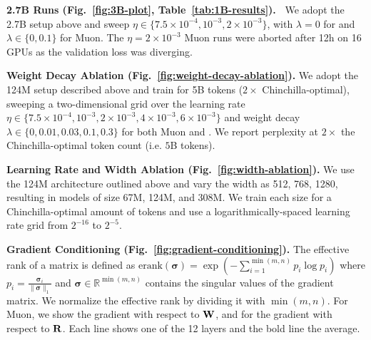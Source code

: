 \textbf{2.7B Runs (Fig.~\ref{fig:3B-plot}, Table~\ref{tab:1B-results}).\ } We adopt the 2.7B setup above and sweep $\eta \in \{7.5\times 10^{-4}, 10^{-3}, 2\times 10^{-3}\}$, with $\lambda=0$ for \algname{} and $\lambda \in \{0, 0.1\}$ for Muon. The $\eta=2\times 10^{-3}$ Muon runs were aborted after 12h on 16 GPUs as the validation loss was diverging.

\textbf{Weight Decay Ablation (Fig.~\ref{fig:weight-decay-ablation}).} We adopt the 124M setup described above and train for 5B tokens ($2\times$ Chinchilla-optimal), sweeping a two-dimensional grid over the learning rate $\eta \in \{7.5 \times 10^{-4}, 10^{-3}, 2 \times 10^{-3}, 4 \times 10^{-3}, 6 \times 10^{-3}\}$ and weight decay $\lambda \in \{0, 0.01, 0.03, 0.1, 0.3\}$ for both Muon and \algname{}. We report perplexity at $2\times$ the Chinchilla-optimal token count (i.e. $5$B tokens).

\textbf{Learning Rate and Width Ablation (Fig.~\ref{fig:width-ablation}).} We use the 124M architecture outlined above and vary the width as 512, 768, 1280, resulting in models of size 67M, 124M, and 308M. We train each size for a Chinchilla-optimal amount of tokens and use a logarithmically-spaced learning rate grid from $2^{-16}$ to $2^{-5}$. 

\textbf{Gradient Conditioning (Fig.\ \ref{fig:gradient-conditioning}).} The effective rank of a matrix is defined as $\mathrm{erank}(\boldsymbol{\sigma}) = \exp (-\sum_{i=1}^{\min(m, n)} p_i \log p_i)$ where $p_i = \frac{\boldsymbol{\sigma}_i}{\| \boldsymbol{\sigma}\|_1}$ and $\boldsymbol{\sigma} \in \mathbb{R}^{\min(m, n)}$ contains the singular values of the gradient matrix. We normalize the effective rank by dividing it with $\min(m, n)$. For Muon, we show the gradient with respect to $\mathbf{W}$, and for \algname{} the gradient with respect to $\mathbf{R}$. Each line shows one of the 12 layers and the bold line the average. 

